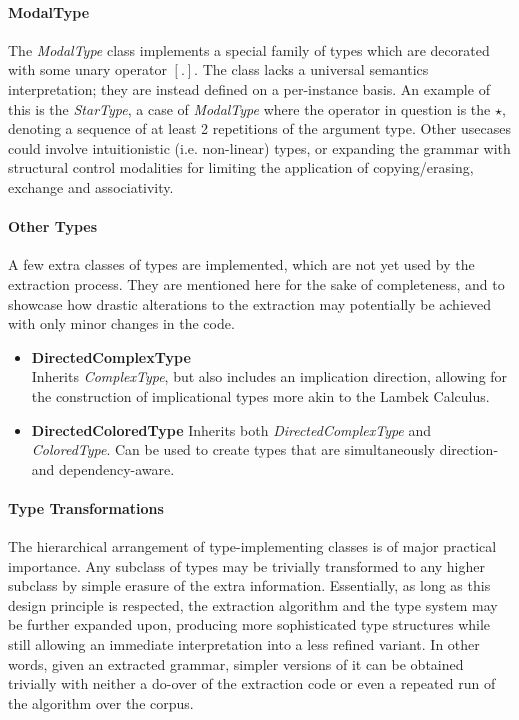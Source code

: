\paragraph{ModalType}
The \textit{ModalType} class implements a special family of types which are decorated with some unary operator $[.]$.
The class lacks a universal semantics interpretation; they are instead defined on a per-instance basis.
An example of this is the \textit{StarType}, a case of \textit{ModalType} where the operator in question is the $\star$, denoting a sequence of at least 2 repetitions of the argument type.
Other usecases could involve intuitionistic (i.e. non-linear) types, or expanding the grammar with structural control modalities for limiting the application of copying/erasing, exchange and associativity.

\paragraph{Other Types}
A few extra classes of types are implemented, which are not yet used by the extraction process.
They are mentioned here for the sake of completeness, and to showcase how drastic alterations to the extraction may potentially be achieved with only minor changes in the code.

\begin{itemize}
    \item \textbf{DirectedComplexType} \\
    Inherits \textit{ComplexType}, but also includes an implication direction, allowing for the construction of implicational types more akin to the Lambek Calculus.
    \item \textbf{DirectedColoredType}
    Inherits both \textit{DirectedComplexType} and \textit{ColoredType}. Can be used to create types that are simultaneously direction- and dependency-aware.
\end{itemize}

\paragraph{Type Transformations}
The hierarchical arrangement of type-implementing classes is of major practical importance. 
Any subclass of types may be trivially transformed to any higher subclass by simple erasure of the extra information.
Essentially, as long as this design principle is respected, the extraction algorithm and the type system may be further expanded upon, producing more sophisticated type structures while still allowing an immediate interpretation into a less refined variant.
In other words, given an extracted grammar, simpler versions of it can be obtained trivially with neither a do-over of the extraction code or even a repeated run of the algorithm over the corpus.

